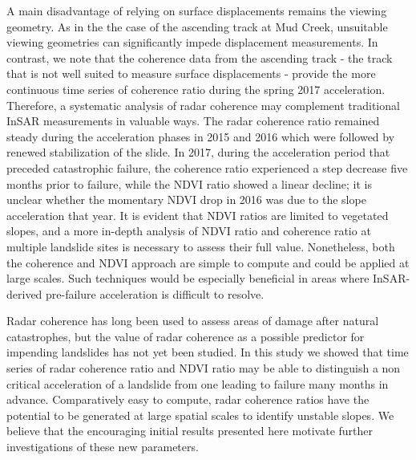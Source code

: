 \documentclass[journal abbreviation, manuscript]{copernicus}
\begin{document}
A main disadvantage of relying on surface displacements remains the viewing geometry. As in the the case of the ascending track at Mud Creek, unsuitable viewing geometries can significantly impede displacement measurements. In contrast, we note that the coherence data from the ascending track - the track that is not well suited to measure surface displacements - provide the more continuous time series of coherence ratio during the spring 2017 acceleration. Therefore, a systematic analysis of radar coherence may complement traditional InSAR measurements in valuable ways. The radar coherence ratio remained steady during the acceleration phases in 2015 and 2016 which were followed by renewed stabilization of the slide. In 2017, during the acceleration period that preceded catastrophic failure, the coherence ratio experienced a step decrease five months prior to failure, while the NDVI ratio showed a linear decline; it is unclear whether the momentary NDVI drop in 2016 was due to the slope acceleration that year. It is evident that NDVI ratios are limited to vegetated slopes, and a more in-depth analysis of NDVI ratio and coherence ratio at multiple landslide sites is necessary to assess their full value. Nonetheless, both the coherence and NDVI approach are simple to compute and could be applied at large scales. Such techniques would be especially beneficial in areas where InSAR-derived pre-failure acceleration is difficult to resolve.  \par


\par



\conclusions  %
Radar coherence has long been used to assess areas of damage after natural catastrophes, but the value of radar coherence as a possible predictor for impending landslides has not yet been studied. In this study we showed that time series of radar coherence ratio and NDVI ratio may be able to distinguish a non critical acceleration of a landslide from one leading to failure many months in advance. Comparatively easy to compute, radar coherence ratios have the potential to be generated at large spatial scales to identify unstable slopes. We believe that the encouraging initial results presented here motivate further investigations of these new parameters.

\end{document}
